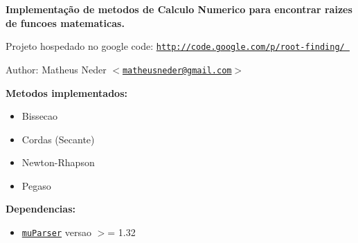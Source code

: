 {\bf Implementação de metodos de Calculo Numerico para encontrar raizes de funcoes matematicas.} \par
\par
  Projeto hospedado no google code: \href{http://code.google.com/p/root-finding/}{\tt http://code.google.com/p/root-finding/ } \begin{Desc}
\item[Author:]Matheus Neder $<$\href{mailto:matheusneder@gmail.com}{\tt matheusneder@gmail.com}$>$\end{Desc}
{\bf Metodos implementados:} \begin{itemize}
\item Bissecao \item Cordas (Secante) \item Newton-Rhapson \item Pegaso \end{itemize}


{\bf Dependencias:} \begin{itemize}
\item \href{http://muparser.sourceforge.net/}{\tt muParser} versao $>$= 1.32 \end{itemize}
